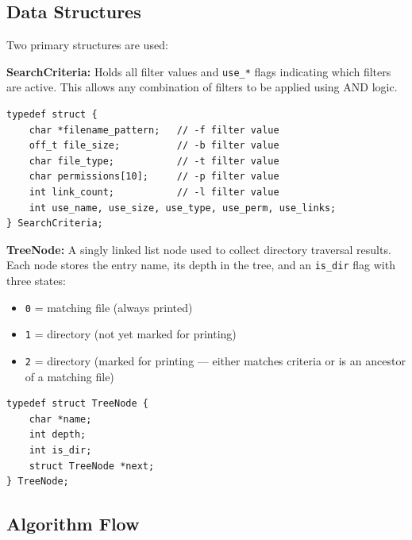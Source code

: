 \documentclass[12pt,a4paper]{article}
\begin{document}
\subsection{Data Structures}

Two primary structures are used:

\textbf{SearchCriteria:} Holds all filter values and \texttt{use\_*} flags indicating which filters are active. This allows any combination of filters to be applied using AND logic.

\begin{lstlisting}
typedef struct {
    char *filename_pattern;   // -f filter value
    off_t file_size;          // -b filter value
    char file_type;           // -t filter value
    char permissions[10];     // -p filter value
    int link_count;           // -l filter value
    int use_name, use_size, use_type, use_perm, use_links;
} SearchCriteria;
\end{lstlisting}

\textbf{TreeNode:} A singly linked list node used to collect directory traversal results. Each node stores the entry name, its depth in the tree, and an \texttt{is\_dir} flag with three states:

\begin{itemize}[nosep]
    \item \texttt{0} = matching file (always printed)
    \item \texttt{1} = directory (not yet marked for printing)
    \item \texttt{2} = directory (marked for printing --- either matches criteria or is an ancestor of a matching file)
\end{itemize}

\begin{lstlisting}
typedef struct TreeNode {
    char *name;
    int depth;
    int is_dir;
    struct TreeNode *next;
} TreeNode;
\end{lstlisting}

\subsection{Algorithm Flow}
\end{document}
